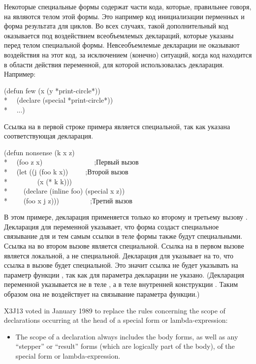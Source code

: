 \begin{defspec}
Некоторые специальные формы содержат части кода, которые, правильнее говоря, на
являются телом этой формы. Это например код инициализации перменных и форма
результата для циклов.
Во всех случаях, такой дополнительный код оказывается под воздействием
всеобъемлемых деклараций, которые указаны перед телом специальной формы.
Невсеобъемлемые декларации не оказывают воздействия на этот код, за исключением
(конечно) ситуаций, когда код находится в области действия переменной, для
которой использовалась декларация.
Например:
\begin{lisp}
(defun few (x  (y *print-circle*)) \\*
~~(declare (special *print-circle*)) \\*
~~...)
\end{lisp}
Ссылка на  в первой строке примера является специальной, так
как указана соответствующая декларация.
\begin{lisp}
(defun nonsense (k x z) \\*
~~(foo z x)~~~~~~~~~~~~~~~;\textrm{Первый вызов } \\*
~~(let ((j (foo k x))~~~~~;\textrm{Второй вызов } \\*
~~~~~~~~(x (* k k))) \\*
~~~~(declare (inline foo) (special x z)) \\*
~~~~(foo x j z)))~~~~~~~~~;\textrm{Третий вызов }
\end{lisp}
В этом примере, декларация  применяется только ко второму и третьему вызову
.
Декларация  для переменной  указывает, что форма 
создаст специальное связывание для  и тем самым ссылки в теле формы также
будут специальными.
Ссылка на  во втором вызове  является специальной.
Ссылка на  в первом вызове  является локальной, а не специальной.
Декларация  для  указывает на то, что ссылка в вызове
 будет специальной. Это значит ссылка не будет указывать на параметр
функции , так как для параметра декларации  не
указано.
(Декларация  переменной  указывается не в теле , а
в теле внутренней конструкции . Таким образом она не воздействует на
связывание параметра функции.)


\begin{new}
X3J13 voted in January 1989
to replace the rules concerning the scope of
declarations occurring at the head of a special form or lambda-expression:
\begin{itemize}
\item The scope of a declaration always includes the body forms, as well as any
``stepper'' or ``result'' forms (which are logically part of the body), of the
special form or lambda-expression.


\end{itemize}
\end{new}
\end{defspec}
